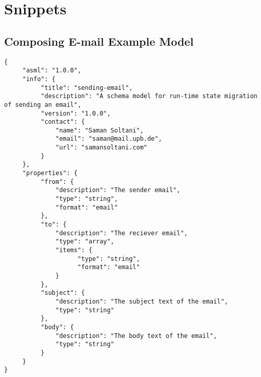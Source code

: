 \chapter{Snippets} 

\label{appendix:compose-email-schema}
\section{Composing E-mail Example Model}
\lstset{
  label=lis:sending-email-schema, caption=Composing E-mail model as JSON Schema document., 
  basicstyle=\ttfamily\footnotesize, frame=single, captionpos=b,
  xleftmargin=.01\textwidth, xrightmargin=.01\textwidth,
  breaklines=true
}
\begin{lstlisting}
{
     "asml": "1.0.0",
     "info": {
          "title": "sending-email",
          "description": "A schema model for run-time state migration of sending an email",
          "version": "1.0.0",
          "contact": {
              "name": "Saman Soltani",
              "email": "saman@mail.upb.de",
              "url": "samansoltani.com"
          }
     },
     "properties": {
          "from": {
              "description": "The sender email",
              "type": "string",
              "format": "email"
          },
          "to": {
              "description": "The reciever email",
              "type": "array",
              "items": {
                    "type": "string",
                    "format": "email"
              }
          },
          "subject": {
              "description": "The subject text of the email",
              "type": "string"
          },
          "body": {
              "description": "The body text of the email",
              "type": "string"
          }
     }
}
\end{lstlisting}


